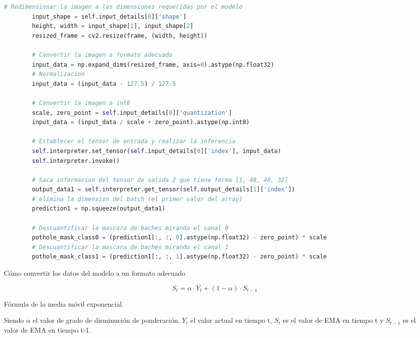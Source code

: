 \begin{code}[h]
	\begin{lstlisting}[language=Python]
		# Redimensionar la imagen a las dimensiones requeridas por el modelo
		input_shape = self.input_details[0]['shape']
		height, width = input_shape[1], input_shape[2]
		resized_frame = cv2.resize(frame, (width, height))
		
		# Convertir la imagen a formato adecuado
		input_data = np.expand_dims(resized_frame, axis=0).astype(np.float32)
		# Normalizacion 
		input_data = (input_data - 127.5) / 127.5 
		
		# Convertir la imagen a int8
		scale, zero_point = self.input_details[0]['quantization']
		input_data = (input_data / scale + zero_point).astype(np.int8)
		
		# Establecer el tensor de entrada y realizar la inferencia
		self.interpreter.set_tensor(self.input_details[0]['index'], input_data)
		self.interpreter.invoke()
		
		# Saca informacion del tensor de salida 2 que tiene forma [1, 48, 48, 32] 
		output_data1 = self.interpreter.get_tensor(self.output_details[1]['index'])
		# elimina la dimension del batch (el primer valor del array)
		prediction1 = np.squeeze(output_data1)
		
		# Descuantificar la mascara de baches mirando el canal 0
		pothole_mask_class0 = (prediction1[:, :, 0].astype(np.float32) - zero_point) * scale
		# Descuantificar la mascara de baches mirando el canal 1
		pothole_mask_class1 = (prediction1[:, :, 1].astype(np.float32) - zero_point) * scale
	\end{lstlisting}
	\caption[Cómo convertir los datos del modelo a un formato adecuado]{Cómo convertir los datos del modelo a un formato adecuado}
	\label{cod:codeconvert}
\end{code}

\begin{myequation}[h]
	\begin{equation}
		S_t = \alpha \cdot Y_t + (1 - \alpha) \cdot S_{t-1}
		\nonumber
	\end{equation}
	\caption[Fórmula de la media móvil exponencial]{Fórmula de la media móvil exponencial}
	\label{ec:ema2}
\end{myequation} 


Siendo $\alpha$  el valor de grado de disminución de ponderación, $Y_t$ el valor actual en tiempo t, $S_t$ es el valor de \acs{EMA} en tiempo t y $S_{t-1}$ es el valor de \acs{EMA} en tiempo t-1.
 
